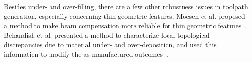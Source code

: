 Besides under- and over-filling, there are a few other robustness issues in toolpath generation, especially concerning thin geometric features.
Moesen et al. proposed a method to make beam compensation more reliable for thin geometric features~\cite{Moesen2011}.
Behandish et al. presented a method to characterize local topological discrepancies due to material under- and over-deposition, and used this information to modify the as-manufactured outcomes~\cite{Behandish2019a}.













